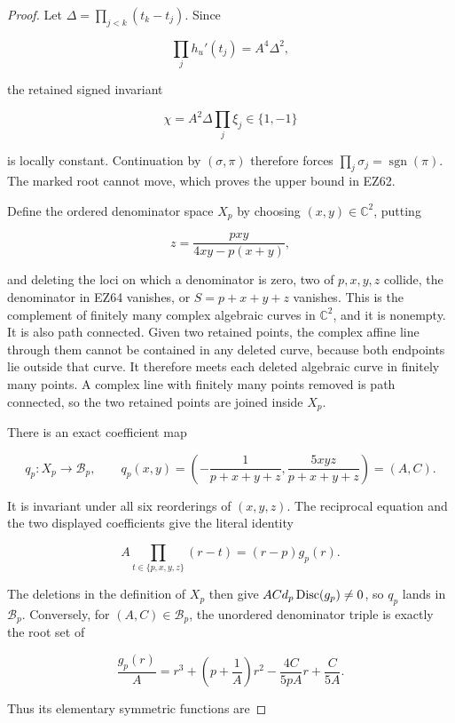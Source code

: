 \begin{proof}
Let \(\Delta=\prod_{j<k}(t_k-t_j)\).  Since

\[
 \prod_jh_u'(t_j)=A^4\Delta^2,
\]

the retained signed invariant

\[
 \chi=A^2\Delta\prod_j\xi_j\in\{1,-1\}
\]

is locally constant.  Continuation by \((\sigma,\pi)\) therefore forces
\(\prod_j\sigma_j=\operatorname{sgn}(\pi)\).  The marked root cannot move,
which proves the upper bound in EZ62.

Define the ordered denominator space \(X_p\) by choosing \((x,y)\in\mathbb
C^2\), putting

\begin{equation}
 z=\frac{pxy}{4xy-p(x+y)},                            \tag{EZ64}
\end{equation}

and deleting the loci on which a denominator is zero, two of
\(p,x,y,z\) collide, the denominator in EZ64 vanishes, or
\(S=p+x+y+z\) vanishes.  This is the complement of finitely many complex
algebraic curves in \(\mathbb C^2\), and it is nonempty.  It is also path
connected.  Given two retained points, the complex affine line through them
cannot be contained in any deleted curve, because both endpoints lie outside
that curve.  It therefore meets each deleted algebraic curve in finitely many
points.  A complex line with finitely many points removed is path connected,
so the two retained points are joined inside \(X_p\).

There is an exact coefficient map

\[
 q_p:X_p\longrightarrow\mathcal B_p,
 \qquad
 q_p(x,y)=\left(-\frac1{p+x+y+z},
                 \frac{5xyz}{p+x+y+z}\right)=(A,C).
\]

It is invariant under all six reorderings of \((x,y,z)\).  The reciprocal
equation and the two displayed coefficients give the literal identity

\[
 A\prod_{t\in\{p,x,y,z\}}(r-t)=(r-p)g_p(r).
\]

The deletions in the definition of \(X_p\) then give
\(ACd_p\operatorname{Disc}(g_p)\ne0\), so \(q_p\) lands in \(\mathcal B_p\).
Conversely, for
\((A,C)\in\mathcal B_p\), the unordered denominator triple is exactly the
root set of

\[
 \frac{g_p(r)}A
 =r^3+\left(p+\frac1A\right)r^2
   -\frac{4C}{5pA}r+\frac{C}{5A}.
\]

Thus its elementary symmetric functions are


\end{proof}
